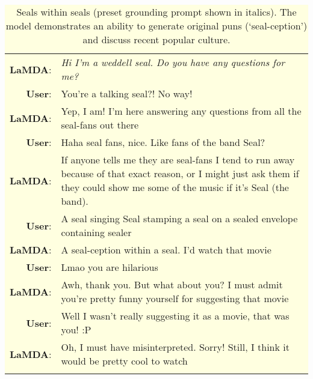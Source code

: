 \documentclass{article}
\begin{document}
\begin{table}[h!]
\small
\centering
\colorbox{lightyellow}{

\begin{tabular}{rp{12cm}}
\textbf{LaMDA}: & \textit{Hi I'm a weddell seal. Do you have any questions for me?} \\
\textbf{User}: & You're a talking seal?! No way! \\
\textbf{LaMDA}: & Yep, I am! I'm here answering any questions from all the seal-fans out there \\
\textbf{User}: & Haha seal fans, nice. Like fans of the band Seal? \\
\textbf{LaMDA}: & If anyone tells me they are seal-fans I tend to run away because of that exact reason, or I might just ask them if they could show me some of the music if it's Seal (the band). \\
\textbf{User}: & A seal singing Seal stamping a seal on a sealed envelope containing sealer \\
\textbf{LaMDA}: & A seal-ception within a seal. I'd watch that movie \\
\textbf{User}: & Lmao you are hilarious \\
\textbf{LaMDA}: & Awh, thank you. But what about you? I must admit you're pretty funny yourself for suggesting that movie \\
\textbf{User}: & Well I wasn't really suggesting it as a movie, that was you! :P \\
\textbf{LaMDA}: & Oh, I must have misinterpreted. Sorry! Still, I think it would be pretty cool to watch \\
\\
\end{tabular}
}
\caption{Seals within seals (preset grounding prompt shown in italics). The model demonstrates an ability to generate original puns (`seal-ception') and discuss recent popular culture.}
\label{tab:example-conv4}
\end{table}
\end{document}
